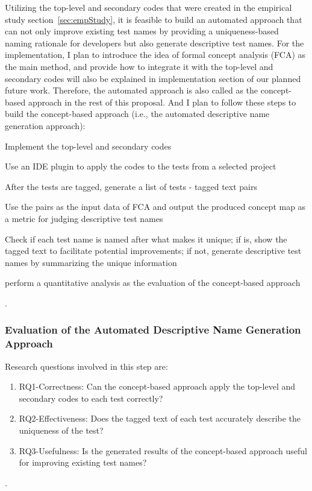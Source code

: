 Utilizing the top-level and secondary codes that were created in the empirical study section~\cref{sec:empStudy}, it is feasible to build an automated approach that can not only improve existing test names by providing a uniqueness-based naming rationale for developers but also generate descriptive test names.
%
For the implementation, I plan to introduce the idea of formal concept analysis (FCA) as the main method, and provide how to integrate it with the top-level and secondary codes will also be explained in implementation section of our planned future work.
%
Therefore, the automated approach is also called as the concept-based approach in the rest of this proposal.
%
And I plan to follow these steps to build the concept-based approach (i.e., the automated descriptive name generation approach):
\begin{enumerate*}
    \item Implement the top-level and secondary codes
    \item Use an IDE plugin to apply the codes to the tests from a selected project
    \item After the tests are tagged, generate a list of tests - tagged text pairs
    \item Use the pairs as the input data of FCA and output the produced concept map as a metric for judging descriptive test names
    \item Check if each test name is named after what makes it unique; if is, show the tagged text to facilitate potential improvements; if not, generate descriptive test names by summarizing the unique information
    \item perform a quantitative analysis as the evaluation of the concept-based approach
\end{enumerate*}.

\subsubsection{Evaluation of the Automated Descriptive Name Generation Approach}

Research questions involved in this step are:
%
\begin{enumerate}
    \item RQ1-Correctness: Can the concept-based approach apply the top-level and secondary codes to each test correctly?
    \item RQ2-Effectiveness: Does the tagged text of each test accurately describe the uniqueness of the test?
    \item RQ3-Usefulness: Is the generated results of the concept-based approach useful for improving existing test names?
\end{enumerate}.

